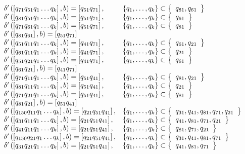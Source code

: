 \begin{align*}
	\begin{array}{ll}
		\gendelta{q_{71}q_{51}}{b}{q_{51}q_{71}}{q_{81},q_{61}}                                                \\
		\gendelta{q_{81}q_{51}}{b}{q_{51}q_{71}}{q_{61}}                                                       \\
		\gendelta{q_{71}q_{61}}{b}{q_{51}q_{71}}{q_{81}}                                                       \\
		\gendelta{q_{81}q_{61}}{b}{q_{51}q_{71}}{}                                                             \\
		\gendelta{q_{51}q_{11}}{b}{q_{41}q_{71}}{q_{61},q_{21}}                                                \\
		\gendelta{q_{61}q_{11}}{b}{q_{41}q_{71}}{q_{21}}                                                       \\
		\gendelta{q_{51}q_{21}}{b}{q_{41}q_{71}}{q_{61}}                                                       \\
		\gendelta{q_{61}q_{21}}{b}{q_{41}q_{71}}{}                                                             \\
		\gendelta{q_{71}q_{11}}{b}{q_{51}q_{41}}{ q_{81}, q_{21}}                                              \\
		\gendelta{q_{81}q_{11}}{b}{q_{51}q_{41}}{ q_{21}}                                                      \\
		\gendelta{q_{71}q_{21}}{b}{q_{51}q_{41}}{ q_{81}}                                                      \\
		\gendelta{q_{81}q_{21}}{b}{q_{51}q_{41}}{}                                                             \\
		\gendelta{q_{150}q_{11}}{b}{q_{21}q_{51}q_{41}}{q_{31},q_{41},q_{81},q_{71},q_{21}}                    \\
		\gendelta{q_{31}q_{11}}{b}{q_{21}q_{51}q_{41}}{q_{41},q_{81},q_{71},q_{21}}                            \\
		\gendelta{q_{41}q_{11}}{b}{q_{21}q_{51}q_{41}}{q_{81},q_{71},q_{21}}                                   \\
		\gendelta{q_{150}q_{21}}{b}{q_{21}q_{51}q_{41}}{q_{31},q_{41},q_{81},q_{71}}                           \\
		\gendelta{q_{31}q_{21}}{b}{q_{21}q_{51}q_{41}}{q_{41},q_{81},q_{71}}                                   \\

\end{array}
\end{align*}
